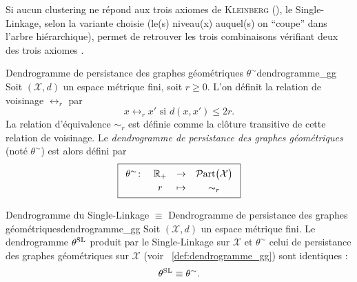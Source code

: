 

Si aucun clustering ne répond aux trois axiomes de \textsc{Kleinberg} (\Res[Kleinberg]), le Single-Linkage, selon la variante choisie (le(s) niveau(x) auquel(s) on ``coupe'' dans l'arbre hiérarchique), permet de retrouver les trois combinaisons vérifiant deux des trois axiomes \cite{Kleinberg2002}. 



\begin{Definition}{Dendrogramme de persistance des graphes géométriques $\theta^{\sim}$}{dendrogramme_gg}
Soit $(\mathcal X,d)$ un espace métrique fini, soit $r\ge 0$. L'on définit la relation de voisinage $\leftrightarrow_r$ par
\[
    x\leftrightarrow_r x' \text{ si } d(x,x') \le 2r.
\]
La relation d'équivalence $\sim_r$ est définie comme la clôture transitive de cette relation de voisinage.
Le \emph{dendrogramme de persistance des graphes géométriques} (noté $\theta^{\sim}$) est alors défini par 
\[
\boxed{
    \renewcommand{\arraystretch}{1.2} %
    \begin{array}{c c c c}
        \theta^{\sim}\colon & \mathbb R_+ & \to & \Partitions{\mathcal X} \\
                 & r & \mapsto & \sim_r
    \end{array}
}
\]
\end{Definition}

\begin{Resultat}{Dendrogramme du Single-Linkage $\equiv$ Dendrogramme de persistance des graphes géométriques}{dendrogramme_gg}
Soit $(\mathcal X,d)$ un espace métrique fini. Le dendrogramme $\theta^{\mathrm{SL}}$ produit par le Single-Linkage sur $\mathcal X$ et $\theta^{\sim}$ celui de persistance des graphes géométriques sur $\mathcal X$ (voir \Def~\ref{def:dendrogramme_gg}) sont identiques :
\[
    \theta^{\mathrm{SL}} \equiv \theta^{\sim}.
\]
\end{Resultat}

